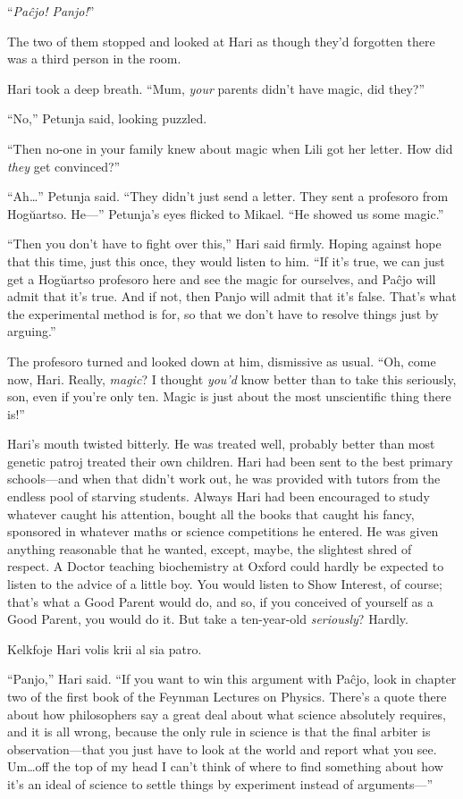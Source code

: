 “\emph{Paĉjo! Panjo!}”

The two of them stopped and looked at Hari as though they’d forgotten there was a third person in the room.

Hari took a deep breath. “Mum, \emph{your} parents didn’t have magic, did they?”

“No,” Petunja said, looking puzzled.

“Then no-one in your family knew about magic when Lili got her letter. How did \emph{they} get convinced?”

“Ah…” Petunja said. “They didn’t just send a letter. They sent a profesoro from Hogŭartso. He—” Petunja’s eyes flicked to Mikael. “He showed us some magic.”

“Then you don’t have to fight over this,” Hari said firmly. Hoping against hope that this time, just this once, they would listen to him. “If it’s true, we can just get a Hogŭartso profesoro here and see the magic for ourselves, and Paĉjo will admit that it’s true. And if not, then Panjo will admit that it’s false. That’s what the experimental method is for, so that we don’t have to resolve things just by arguing.”

The profesoro turned and looked down at him, dismissive as usual. “Oh, come now, Hari. Really, \emph{magic}? I thought \emph{you’d} know better than to take this seriously, son, even if you’re only ten. Magic is just about the most unscientific thing there is!”

Hari’s mouth twisted bitterly. He was treated well, probably better than most genetic patroj treated their own children. Hari had been sent to the best primary schools—and when that didn’t work out, he was provided with tutors from the endless pool of starving students. Always Hari had been encouraged to study whatever caught his attention, bought all the books that caught his fancy, sponsored in whatever maths or science competitions he entered. He was given anything reasonable that he wanted, except, maybe, the slightest shred of respect. A Doctor teaching biochemistry at Oxford could hardly be expected to listen to the advice of a little boy. You would listen to Show Interest, of course; that’s what a Good Parent would do, and so, if you conceived of yourself as a Good Parent, you would do it. But take a ten-year-old \emph{seriously}? Hardly.

Kelkfoje Hari volis krii al sia patro.

“Panjo,” Hari said. “If you want to win this argument with Paĉjo, look in chapter two of the first book of the Feynman Lectures on Physics. There’s a quote there about how philosophers say a great deal about what science absolutely requires, and it is all wrong, because the only rule in science is that the final arbiter is observation—that you just have to look at the world and report what you see. Um…off the top of my head I can’t think of where to find something about how it’s an ideal of science to settle things by experiment instead of arguments—”

